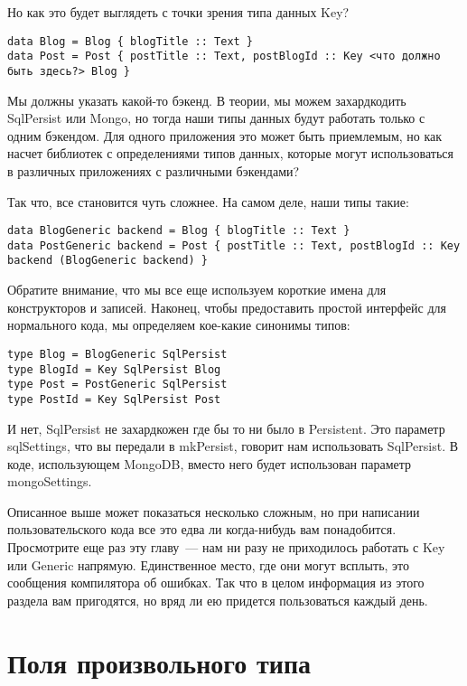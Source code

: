 Но как это будет выглядеть с точки зрения типа данных Key?

\begin{lstlisting}
data Blog = Blog { blogTitle :: Text }
data Post = Post { postTitle :: Text, postBlogId :: Key <что должно быть здесь?> Blog }
\end{lstlisting}

Мы должны указать какой-то бэкенд. В теории, мы можем захардкодить SqlPersist или Mongo, но тогда наши типы данных будут работать только с одним бэкендом. Для одного приложения это может быть приемлемым, но как насчет библиотек с определениями типов данных, которые могут использоваться в различных приложениях с различными бэкендами?

Так что, все становится чуть сложнее. На самом деле, наши типы такие:

\begin{lstlisting}
data BlogGeneric backend = Blog { blogTitle :: Text }
data PostGeneric backend = Post { postTitle :: Text, postBlogId :: Key backend (BlogGeneric backend) }
\end{lstlisting}

Обратите внимание, что мы все еще используем короткие имена для конструкторов и записей. Наконец, чтобы предоставить простой интерфейс для нормального кода, мы определяем кое-какие синонимы типов:

\begin{lstlisting}
type Blog = BlogGeneric SqlPersist
type BlogId = Key SqlPersist Blog
type Post = PostGeneric SqlPersist
type PostId = Key SqlPersist Post
\end{lstlisting}

И нет, SqlPersist не захардкожен где бы то ни было в Persistent. Это параметр sqlSettings, что вы передали в mkPersist, говорит нам использовать SqlPersist. В коде, использующем MongoDB, вместо него будет использован параметр mongoSettings.

Описанное выше может показаться несколько сложным, но при написании пользовательского кода все это едва ли когда-нибудь вам понадобится. Просмотрите еще раз эту главу~--- нам ни разу не приходилось работать с Key или Generic напрямую. Единственное место, где они могут всплыть, это сообщения компилятора об ошибках. Так что в целом информация из этого раздела вам пригодятся, но вряд ли ею придется пользоваться каждый день.

\section{Поля произвольного типа} %

